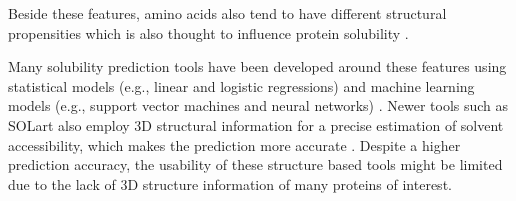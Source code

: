 

Beside these features, amino acids also tend to have different structural propensities which is also thought to influence protein solubility \cite{Idicula-Thomas2005-qw, Huang2012-ft}.


Many solubility prediction tools have been developed around these features using statistical models (e.g., linear and logistic regressions) and machine learning models (e.g., support vector machines and neural networks) \cite{Hirose2013-nq, Habibi2014-jq, Hebditch2017-bg, Sormanni2017-lo, Heckmann2018-wb, Wu2019-nz, Yang2019-kd}. Newer tools such as SOLart also employ 3D structural information for a precise estimation of solvent accessibility, which makes the prediction more accurate \cite{hou2020solart}. Despite a higher prediction accuracy, the usability of these structure based tools might be limited due to the lack of 3D structure information of many proteins of interest.




